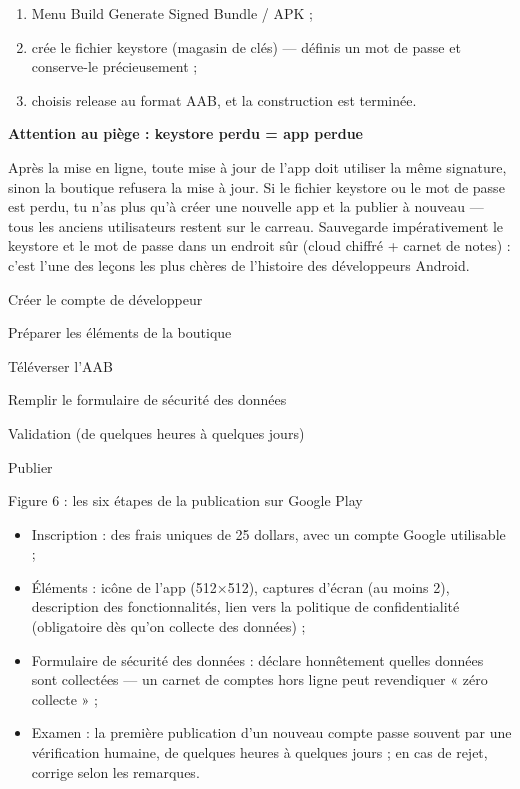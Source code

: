 \begin{enumerate}
  \item Menu Build Generate Signed Bundle / APK ;
  \item crée le fichier keystore (magasin de clés) — définis un mot de passe et conserve-le précieusement ;
  \item choisis release au format AAB, et la construction est terminée.
\end{enumerate}

\textbf{Attention au piège : keystore perdu = app perdue}\par

Après la mise en ligne, toute mise à jour de l’app doit utiliser la même signature, sinon la boutique refusera la mise à jour. Si le fichier keystore ou le mot de passe est perdu, tu n’as plus qu’à créer une nouvelle app et la publier à nouveau — tous les anciens utilisateurs restent sur le carreau. Sauvegarde impérativement le keystore et le mot de passe dans un endroit sûr (cloud chiffré + carnet de notes) : c’est l’une des leçons les plus chères de l’histoire des développeurs Android.


Créer le compte de développeur

Préparer les éléments de la boutique

Téléverser l'AAB

Remplir le formulaire de sécurité des données

Validation (de quelques heures à quelques jours)

Publier

\begin{center}\small\color{gray}Figure 6 : les six étapes de la publication sur Google Play\end{center}

\begin{itemize}
  \item Inscription : des frais uniques de 25 dollars, avec un compte Google utilisable ;
  \item Éléments : icône de l’app (512×512), captures d’écran (au moins 2), description des fonctionnalités, lien vers la politique de confidentialité (obligatoire dès qu’on collecte des données) ;
  \item Formulaire de sécurité des données : déclare honnêtement quelles données sont collectées — un carnet de comptes hors ligne peut revendiquer « zéro collecte » ;
  \item Examen : la première publication d’un nouveau compte passe souvent par une vérification humaine, de quelques heures à quelques jours ; en cas de rejet, corrige selon les remarques.
\end{itemize}

